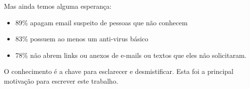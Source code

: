 Mas ainda temos alguma esperança:
\begin{itemize}
\item 89\% apagam email suspeito de pessoas que não conhecem
\item 83\% possuem ao menos um anti-virus básico
\item 78\% não abrem links ou anexos de e-mails ou textos que eles não solicitaram.
\end{itemize}

O conhecimento é a chave para esclarecer e desmistificar. Esta foi a principal motivação para escrever este trabalho. 
